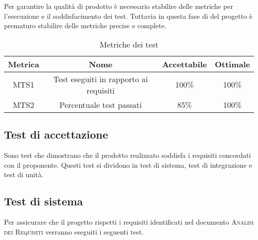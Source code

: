 \documentclass[../piano_di_qualifica.tex]{subfiles}
\begin{document}
Per garantire la qualità di prodotto è necessario stabilire delle metriche per l’esecuzione e il soddisfacimento dei test. Tuttavia in questa fase di del progetto è prematuro stabilire delle metriche precise e complete.


\begin{table}[!ht]
	\centering
	\begin{tabular}{|c|c|c|c|}
		\hline
		\rowcolor{lightgray}
		\textbf{Metrica} & \textbf{Nome}                          & \textbf{Accettabile} & \textbf{Ottimale} \\
		\hline
		MTS1             & Test eseguiti in rapporto ai requisiti & 100\%                & 100\%             \\
		MTS2             & Percentuale test passati               & 85\%                 & 100\%             \\
		\hline
	\end{tabular}
	\caption{Metriche dei test}
\end{table}

\subsection{Test di accettazione}%
\label{sub:test_accett}
Sono test che dimostrano che il prodotto realizzato soddisfa i requisiti concordati con il proponente.
Questi test si dividono in test di sistema, test di integrazione e test di unità.

\subsection{Test di sistema}%
\label{sub:test_sist}
Per assicurare che il progetto rispetti i requisiti identificati nel documento \textsc{Analisi dei Requisiti} verranno eseguiti i seguenti test.
\end{document}
